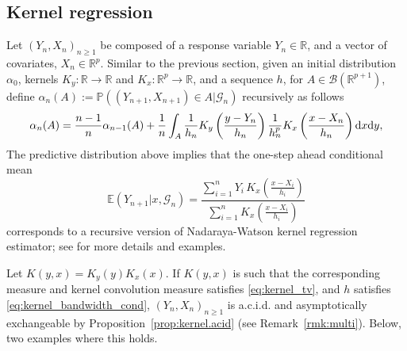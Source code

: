 \documentclass{article}
\theoremstyle{definition}
\newcommand{\di}{{\rm d}}
\renewcommand{\&}{and}
\begin{document}
\subsection{Kernel regression}\label{sec:kernel_regr}

Let $(Y_{n},X_{n})_{n \geq 1}$ be %
composed of a response variable $Y_{n}\in \mathbb{R}$, and a vector of covariates, $X_n\in \mathbb{R}^p$. Similar to the previous section, given an initial distribution $\alpha_0$,  kernels $K_y: \mathbb{R} \to \mathbb{R}$ and  $K_x: \mathbb{R}^{p} \to \mathbb{R}$, and a sequence $h$, for $A\in \mathcal{B}(\mathbb{R}^{p+1})$, define $\alpha_{n}(A):=\mathbb{P}((Y_{n+1},X_{n+1})\in A |\mathcal{G}_{n})$ recursively as follows \begin{equation} \label{eq:kernel_reg}
	\alpha_{n}(A)=\frac{n-1}{n}\alpha_{n-1}(A)+\frac{1}{n} \int_{A} \frac{1}{h_n} K_y\left(\frac{y-Y_{n}}{h_{n}}\right) \frac{1}{h^p_n} K_x\left(\frac{x-X_{n}}{h_{n}}\right)\di x \di y,
\end{equation}
The predictive distribution above implies that the one-step ahead conditional mean
\begin{equation}\label{eq:mean_kernel_regr}
\mathbb{E}(Y_{n+1}|x ,\mathcal{G}_n) =\frac{\sum_{i=1}^n Y_i \, K_x(\frac{x-X_i}{h_i})}{\sum_{i=1}^n   K_x(\frac{x-X_i}{h_i})}
\end{equation}
corresponds to a recursive version of Nadaraya-Watson kernel regression estimator; see \cite{gyorfi2006distribution} for more details and examples. %

Let $K(y,x)=K_y(y)K_x(x)$. If $K(y,x)$ is such that the corresponding measure and kernel convolution measure satisfies \eqref{eq:kernel_tv}, and $h$ satisfies \eqref{eq:kernel_bandwidth_cond}, $(Y_n, X_n)_{n \geq 1}$ is %
a.c.i.d. and asymptotically exchangeable by Proposition~\ref{prop:kernel.acid} (see Remark~\ref{rmk:multi}). Below,  two examples where this holds. 
\end{document}
